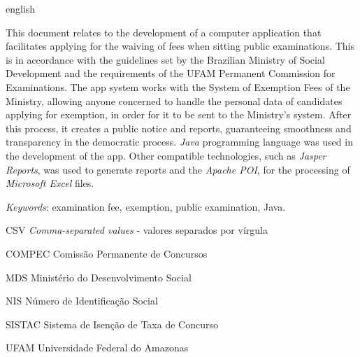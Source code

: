 \documentclass[
	12pt,			%
	openright,		%
	oneside,	
	a4paper,		%
	english,		%
	brazil			%
]{abntex2/abntex2}  %
\begin{document}
	\begin{abstracteng}[Abstract]
		\begin{otherlanguage*}{english}
		
			This document relates to the development of a computer application that facilitates applying for the waiving of fees when sitting public examinations. This is in accordance with the guidelines set by the Brazilian Ministry of Social Development and the requirements of the UFAM Permanent Commission for Examinations. The app system works with the System of Exemption Fees of the Ministry, allowing anyone concerned to handle the personal data of candidates applying for exemption, in order for it to be sent to the Ministry's system. After this process, it creates a public notice and reports, guaranteeing smoothness and transparency in the democratic process. \textit{Java} programming language was used in the development of the app. Other compatible technologies, such as \textit{Jasper Reports}, was used to generate reports and the \textit{Apache POI}, for the processing of \textit{Microsoft Excel} files.

			\vspace{\onelineskip}
			\noindent
			\textit{Keywords}: examination fee, exemption, public examination, Java.
	
		\end{otherlanguage*}
	\end{abstracteng}

	\listoffigures*
	\cleardoublepage

	\listoftables*
	\cleardoublepage


	\begin{siglas}

		\item[CSV] \textit{Comma-separated values} - valores separados por vírgula
		\item[COMPEC] Comissão Permanente de Concursos
		\item[MDS] Ministério do Desenvolvimento Social
		\item[NIS] Número de Identificação Social
		\item[SISTAC] Sistema de Isenção de Taxa de Concurso
		\item[UFAM] Universidade Federal do Amazonas

	\end{siglas}
\end{document}
